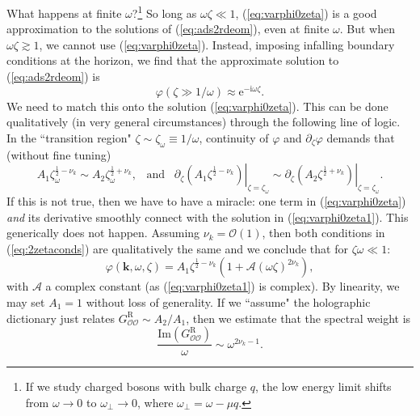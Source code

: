 \documentclass[10pt, oneside]{book}
\begin{document}
\begin{doublespace}
What happens at finite $\omega$?\footnote{If we study charged bosons with bulk charge $q$, the low energy limit shifts from $\omega \rightarrow 0$ to $\omega_\perp \rightarrow 0$, where $\omega_\perp = \omega - \mu q$.}  So long as $\omega \zeta \ll 1$, (\ref{eq:varphi0zeta}) is a good approximation to the solutions of (\ref{eq:ads2rdeom}), even at finite $\omega$.     But when $\omega \zeta \gtrsim 1$,  we cannot use (\ref{eq:varphi0zeta}).  Instead, imposing infalling boundary conditions at the horizon, we find that the approximate solution to (\ref{eq:ads2rdeom}) is \begin{equation}
\varphi(\zeta \gg 1/\omega) \approx \mathrm{e}^{-\mathrm{i}\omega\zeta}.  \label{eq:varphi0zeta1}
\end{equation}
We need to match this onto the solution (\ref{eq:varphi0zeta}).   This can be done qualitatively (in very general circumstances) through the following line of logic.   In the ``transition region"  $\zeta \sim \zeta_\omega \equiv 1/\omega$,  continuity of $\varphi$ and $\partial_\zeta\varphi$  demands that (without fine tuning) \begin{equation}
A_1 \zeta_\omega ^{\frac{1}{2}-\nu_k} \sim A_2 \zeta_\omega ^{\frac{1}{2}+\nu_k}, \;\;\; \text{and} \;\;\; \left.\partial_\zeta \left(A_1 \zeta ^{\frac{1}{2}-\nu_k}\right)\right|_{\zeta=\zeta_\omega} \sim \left.\partial_\zeta \left(A_2 \zeta ^{\frac{1}{2}+\nu_k}\right)\right|_{\zeta=\zeta_\omega}.  \label{eq:2zetaconds}
\end{equation}
If this is not true, then we have to have a miracle: one term in (\ref{eq:varphi0zeta}) \emph{and} its derivative smoothly connect with the solution in (\ref{eq:varphi0zeta1}).   This generically does not happen.   Assuming $\nu_k=\mathcal{O}(1)$, then both conditions in (\ref{eq:2zetaconds}) are qualitatively the same and we conclude that for $\zeta \omega \ll 1$: \begin{equation}
\varphi(\mathbf{k},\omega,\zeta) = A_1 \zeta^{\frac{1}{2}-\nu_k} \left(1+\mathcal{A}(\omega\zeta)^{2\nu_k}\right),  \label{eq:varphiomega}
\end{equation}
with $\mathcal{A}$ a complex constant (as (\ref{eq:varphi0zeta1}) is complex).   By linearity, we may set $A_1=1$ without loss of generality.   If we ``assume" the holographic dictionary just relates $G^{\mathrm{R}}_{\mathcal{OO}} \sim A_2/A_1$, then we estimate that the spectral weight is \begin{equation}
\frac{\mathrm{Im}\left(G^{\mathrm{R}}_{\mathcal{OO}}\right)}{\omega} \sim \omega^{2\nu_k-1}.  \label{eq:SWT0}
\end{equation}


\end{doublespace}
\end{document}
